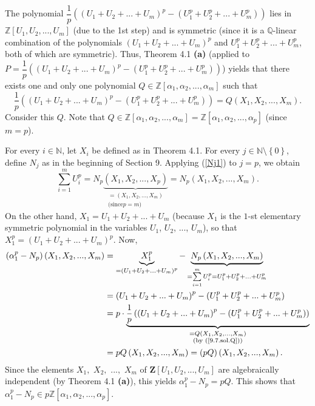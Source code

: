 \documentclass[numbers=enddot,12pt,final,onecolumn,notitlepage]{scrartcl}%
\begin{document}
The polynomial $\dfrac{1}{p}\left(  \left(  U_{1}+U_{2}+...+U_{m}\right)
^{p}-\left(  U_{1}^{p}+U_{2}^{p}+...+U_{m}^{p}\right)  \right)  $ lies in
$\mathbb{Z}\left[  U_{1},U_{2},...,U_{m}\right]  $ (due to the 1st step) and
is symmetric (since it is a $\mathbb{Q}$-linear combination of the polynomials
$\left(  U_{1}+U_{2}+...+U_{m}\right)  ^{p}$ and $U_{1}^{p}+U_{2}%
^{p}+...+U_{m}^{p}$, both of which are symmetric). Thus, Theorem 4.1
\textbf{(a)} (applied to $P=\dfrac{1}{p}\left(  \left(  U_{1}+U_{2}%
+...+U_{m}\right)  ^{p}-\left(  U_{1}^{p}+U_{2}^{p}+...+U_{m}^{p}\right)
\right)  $) yields that there exists one and only one polynomial
$Q\in\mathbb{Z}\left[  \alpha_{1},\alpha_{2},...,\alpha_{m}\right]  $ such
that%
\begin{equation}
\dfrac{1}{p}\left(  \left(  U_{1}+U_{2}+...+U_{m}\right)  ^{p}-\left(
U_{1}^{p}+U_{2}^{p}+...+U_{m}^{p}\right)  \right)  =Q\left(  X_{1}%
,X_{2},...,X_{m}\right)  . \label{9.7.sol.Q}%
\end{equation}
Consider this $Q$. Note that $Q\in\mathbb{Z}\left[  \alpha_{1},\alpha
_{2},...,\alpha_{m}\right]  =\mathbb{Z}\left[  \alpha_{1},\alpha
_{2},...,\alpha_{p}\right]  $ (since $m=p$).

For every $i\in\mathbb{N}$, let $X_{i}$ be defined as in Theorem 4.1. For
every $j\in\mathbb{N}\setminus\left\{  0\right\}  $, define $N_{j}$ as in the
beginning of Section 9. Applying (\ref{Nj1}) to $j=p$, we obtain%
\[
\sum_{i=1}^{m}U_{i}^{p}=N_{p}\underbrace{\left(  X_{1},X_{2},...,X_{p}\right)
}_{\substack{=\left(  X_{1},X_{2},...,X_{m}\right)  \\\text{(since
}p=m\text{)}}}=N_{p}\left(  X_{1},X_{2},...,X_{m}\right)  .
\]
On the other hand, $X_{1}=U_{1}+U_{2}+...+U_{m}$ (because $X_{1}$ is the
$1$-st elementary symmetric polynomial in the variables $U_{1}$, $U_{2}$,
$...$, $U_{m}$), so that $X_{1}^{p}=\left(  U_{1}+U_{2}+...+U_{m}\right)
^{p}$. Now,%
\begin{align*}
\left(  \alpha_{1}^{p}-N_{p}\right)  \left(  X_{1},X_{2},...,X_{m}\right)   &
=\underbrace{X_{1}^{p}}_{=\left(  U_{1}+U_{2}+...+U_{m}\right)  ^{p}%
}-\underbrace{N_{p}\left(  X_{1},X_{2},...,X_{m}\right)  }_{=\sum
\limits_{i=1}^{m}U_{i}^{p}=U_{1}^{p}+U_{2}^{p}+...+U_{m}^{p}}\\
&  =\left(  U_{1}+U_{2}+...+U_{m}\right)  ^{p}-\left(  U_{1}^{p}+U_{2}%
^{p}+...+U_{m}^{p}\right) \\
&  =p\cdot\underbrace{\dfrac{1}{p}\left(  \left(  U_{1}+U_{2}+...+U_{m}%
\right)  ^{p}-\left(  U_{1}^{p}+U_{2}^{p}+...+U_{m}^{p}\right)  \right)
}_{\substack{=Q\left(  X_{1},X_{2},...,X_{m}\right)  \\\text{(by
(\ref{9.7.sol.Q}))}}}\\
&  =pQ\left(  X_{1},X_{2},...,X_{m}\right)  =\left(  pQ\right)  \left(
X_{1},X_{2},...,X_{m}\right)  .
\end{align*}
Since the elements $X_{1},$ $X_{2},$ $...,$ $X_{m}$ of $\mathbf{Z}\left[
U_{1},U_{2},...,U_{m}\right]  $ are algebraically independent (by Theorem 4.1
\textbf{(a)}), this yields $\alpha_{1}^{p}-N_{p}=pQ$. This shows that
$\alpha_{1}^{p}-N_{p}\in p\mathbb{Z}\left[  \alpha_{1},\alpha_{2}%
,...,\alpha_{p}\right]  $.
\end{document}
